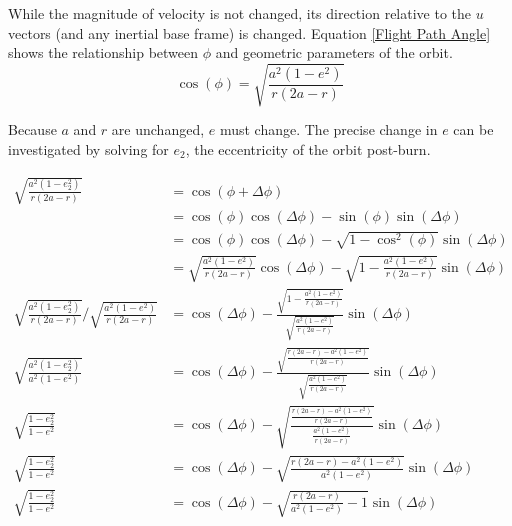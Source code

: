 \documentclass{article}
\begin{document}
While the magnitude of velocity is not changed, its direction relative to the $u$ vectors (and any inertial base frame) is changed. Equation \eqref{Flight Path Angle} shows the relationship between $\phi$ and geometric parameters of the orbit.
$$\cos(\phi)=\sqrt{\frac{a^2(1-e^2)}{r(2a-r)}}$$

Because $a$ and $r$ are unchanged, $e$ must change. The precise change in $e$ can be investigated by solving for $e_2$, the eccentricity of the orbit post-burn.

\begin{align*}
    \sqrt{\frac{a^2(1-e_2^2)}{r(2a-r)}}                                   & =\cos(\phi+\Delta \phi)                                                                                                 \\
                                                                          & =\cos(\phi)\cos(\Delta \phi)-\sin(\phi)\sin(\Delta \phi)                                                                \\
                                                                          & =\cos(\phi)\cos(\Delta \phi)-\sqrt{1-\cos^2(\phi)}\sin(\Delta \phi)                                                     \\
                                                                          & =\sqrt{\frac{a^2(1-e^2)}{r(2a-r)}}\cos(\Delta \phi)-\sqrt{1-\frac{a^2(1-e^2)}{r(2a-r)}}\sin(\Delta \phi)                \\
    \sqrt{\frac{a^2(1-e_2^2)}{r(2a-r)}}/\sqrt{\frac{a^2(1-e^2)}{r(2a-r)}} & =\cos(\Delta \phi)-\frac{\sqrt{1-\frac{a^2(1-e^2)}{r(2a-r)}}}{\sqrt{\frac{a^2(1-e^2)}{r(2a-r)}}}\sin(\Delta \phi)       \\
    \sqrt{\frac{a^2(1-e_2^2)}{a^2(1-e^2)}}                                & =\cos(\Delta \phi)-\frac{\sqrt{\frac{r(2a-r)-a^2(1-e^2)}{r(2a-r)}}}{\sqrt{\frac{a^2(1-e^2)}{r(2a-r)}}}\sin(\Delta \phi) \\
    \sqrt{\frac{1-e_2^2}{1-e^2}}                                          & =\cos(\Delta \phi)-\sqrt{\frac{\frac{r(2a-r)-a^2(1-e^2)}{r(2a-r)}}{\frac{a^2(1-e^2)}{r(2a-r)}}}\sin(\Delta \phi)        \\
    \sqrt{\frac{1-e_2^2}{1-e^2}}                                          & =\cos(\Delta \phi)-\sqrt{\frac{r(2a-r)-a^2(1-e^2)}{a^2(1-e^2)}}\sin(\Delta \phi)                                        \\
    \sqrt{\frac{1-e_2^2}{1-e^2}}                                          & =\cos(\Delta \phi)-\sqrt{\frac{r(2a-r)}{a^2(1-e^2)}-1}\sin(\Delta \phi)                                                 \\

\end{align*}
\end{document}
